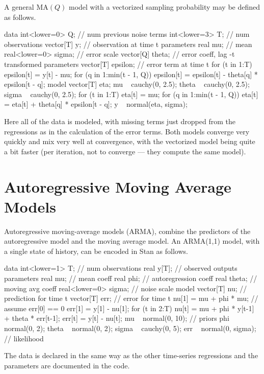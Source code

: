 A general $\mbox{MA}(Q)$ model with a vectorized sampling probability
may be defined as follows.
%
\begin{stancode}
data {
  int<lower=0> Q;  // num previous noise terms
  int<lower=3> T;  // num observations
  vector[T] y;     // observation at time t
}
parameters {
  real mu;              // mean
  real<lower=0> sigma;  // error scale
  vector[Q] theta;      // error coeff, lag -t
}
transformed parameters {
  vector[T] epsilon;    // error term at time t
  for (t in 1:T) {
    epsilon[t] = y[t] - mu;
    for (q in 1:min(t - 1, Q))
      epsilon[t] = epsilon[t] - theta[q] * epsilon[t - q];
  }
}
model {
  vector[T] eta;
  mu ~ cauchy(0, 2.5);
  theta ~ cauchy(0, 2.5);
  sigma ~ cauchy(0, 2.5);
  for (t in 1:T) {
    eta[t] = mu;
    for (q in 1:min(t - 1, Q))
      eta[t] = eta[t] + theta[q] * epsilon[t - q];
  }
  y ~ normal(eta, sigma);
}
\end{stancode}
%
Here all of the data is modeled, with missing terms just dropped from
the regressions as in the calculation of the error terms.  Both models
converge very quickly and mix very well at convergence, with the
vectorized model being quite a bit faster (per iteration, not to
converge --- they compute the same model).


\section{Autoregressive Moving Average Models}

Autoregressive moving-average models (ARMA), combine the predictors
of the autoregressive model and the moving average model.  An
ARMA(1,1) model, with a single state of history, can be encoded in
Stan as follows.
%
\begin{stancode}
data {
  int<lower=1> T;            // num observations
  real y[T];                 // observed outputs
}
parameters {
  real mu;                   // mean coeff
  real phi;                  // autoregression coeff
  real theta;                // moving avg coeff
  real<lower=0> sigma;       // noise scale
}
model {
  vector[T] nu;              // prediction for time t
  vector[T] err;             // error for time t
  nu[1] = mu + phi * mu;    // assume err[0] == 0
  err[1] = y[1] - nu[1];
  for (t in 2:T) {
    nu[t] = mu + phi * y[t-1] + theta * err[t-1];
    err[t] = y[t] - nu[t];
  }
  mu ~ normal(0, 10);         // priors
  phi ~ normal(0, 2);
  theta ~ normal(0, 2);
  sigma ~ cauchy(0, 5);
  err ~ normal(0, sigma);    // likelihood
}
\end{stancode}
%
The data is declared in the same way as the other time-series
regressions and the parameters are documented in the code. 

